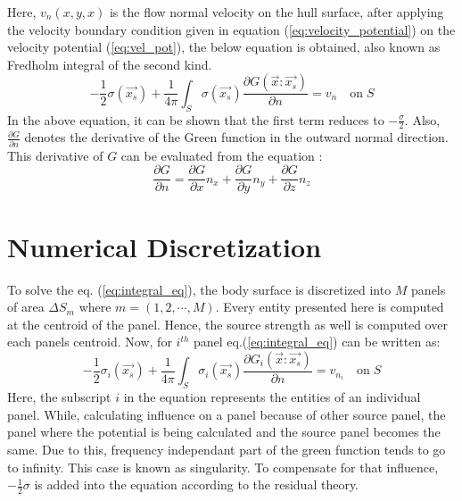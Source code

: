 Here, $v_n(x, y, x)$ is the flow normal velocity on the hull surface, after applying the velocity boundary condition given in equation (\ref{eq:velocity_potential}) on the velocity potential (\ref{eq:vel_pot}), the below equation is obtained, also known as Fredholm integral of the second kind.
\begin{equation}
    \label{eq:integral_eq}
    -\frac{1}{2}\sigma(\vec{x_s}) + \frac{1}{4\pi}\int_S\sigma(\vec{x_s})\frac{\partial G(\vec{x}:\vec{x_s})}{\partial n} = v_n \quad \text{on}\; S
\end{equation}
In the above equation, it can be shown that the first term reduces to $-\frac{\sigma}{2}$. Also, 
$\frac{\partial G}{\partial n}$ denotes the derivative of the Green function in the outward normal direction. This derivative of $G$ can be evaluated from the equation :
\begin{equation}
    \frac{\partial G}{\partial n} = \frac{\partial G}{\partial x}n_x + \frac{\partial G}{\partial y}n_y + \frac{\partial G}{\partial z}n_z
\end{equation}

\section{Numerical Discretization}
To solve the eq. (\ref{eq:integral_eq}), the body surface is discretized into $M$ panels of area 
$\Delta S_m$ where $m = (1, 2, \cdots, M)$. Every entity presented here is computed at the centroid of the panel.
Hence, the source strength as well is computed over each panels centroid. Now, for $i^{th}$ panel eq.(\ref{eq:integral_eq}) can be written as:
\begin{equation}
    \label{eq:dis_integral_eq}
    -\frac{1}{2}\sigma_i(\vec{x_s}) + \frac{1}{4\pi}\int_S\sigma_i(\vec{x_s})\frac{\partial G_i(\vec{x}:\vec{x_s})}{\partial n} = v_{n_i} \quad \text{on}\; S
\end{equation}
Here, the subscript $i$ in the equation represents the entities of an individual panel.
While, calculating influence on a panel because of other source panel, the panel where the potential is being calculated and the source panel becomes the same. Due to this, frequency independant part of the green function tends to go to infinity. This case is known as singularity. To compensate for that influence, $-\frac{1}{2}\sigma$ is added into the equation according to the residual theory.

